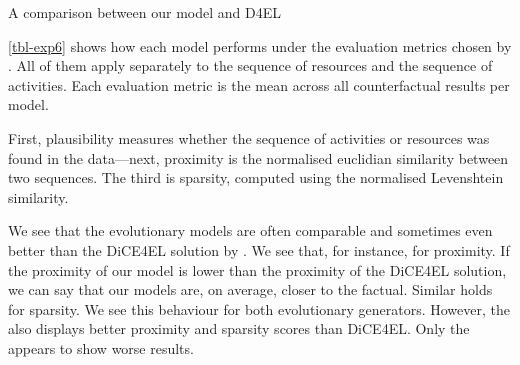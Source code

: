 \documentclass[./../../paper.tex]{subfiles}
\begin{document}
\begin{table}
    \centering    
    \resizebox{\linewidth}{!}{
        
        
    }
\caption{A comparison between our model and D4EL}
\label{tbl-exp6}
\end{table}

\autoref{tbl-exp6} shows how each model performs under the evaluation metrics chosen by \citeauthor{hsieh_DiCE4ELInterpretingProcess_2021}. All of them apply separately to the sequence of resources and the sequence of activities. Each evaluation metric is the mean across all counterfactual results per model.

First, plausibility measures whether the sequence of activities or resources was found in the data—next, proximity is the normalised euclidian similarity between two sequences. The third is sparsity, computed using the normalised Levenshtein similarity. 

We see that the evolutionary models are often comparable and sometimes even better than the DiCE4EL solution by \citeauthor{hsieh_DiCE4ELInterpretingProcess_2021}. We see that, for instance, for proximity. If the proximity of our model is lower than the proximity of the DiCE4EL solution, we can say that our models are, on average, closer to the factual. Similar holds for sparsity. We see this behaviour for both evolutionary generators. However, the \ModelCBG also displays better proximity and sparsity scores than DiCE4EL. Only the \ModelRNG appears to show worse results. 





\end{document}
